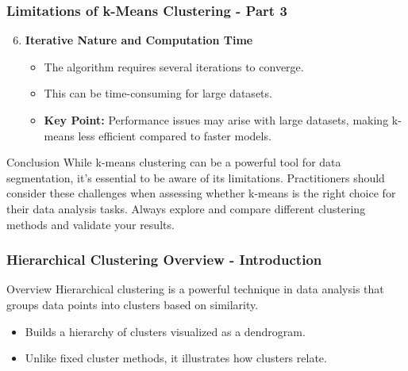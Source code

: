\documentclass[aspectratio=169]{beamer}
\begin{document}
\begin{frame}[fragile]
    \frametitle{Limitations of k-Means Clustering - Part 3}
    \begin{enumerate}
        \setcounter{enumi}{5} %
        \item \textbf{Iterative Nature and Computation Time}  
        \begin{itemize}
            \item The algorithm requires several iterations to converge.
            \item This can be time-consuming for large datasets.
            \item \textbf{Key Point:} Performance issues may arise with large datasets, making k-means less efficient compared to faster models.
        \end{itemize}
    \end{enumerate}

    \begin{block}{Conclusion}
        While k-means clustering can be a powerful tool for data segmentation, it's essential to be aware of its limitations. 
        Practitioners should consider these challenges when assessing whether k-means is the right choice for their data analysis tasks. 
        Always explore and compare different clustering methods and validate your results.
    \end{block}
\end{frame}

\begin{frame}[fragile]
    \frametitle{Hierarchical Clustering Overview - Introduction}
    \begin{block}{Overview}
        Hierarchical clustering is a powerful technique in data analysis that groups data points into clusters based on similarity.
    \end{block}
    \begin{itemize}
        \item Builds a hierarchy of clusters visualized as a dendrogram.
        \item Unlike fixed cluster methods, it illustrates how clusters relate.
    \end{itemize}
\end{frame}
\end{document}
